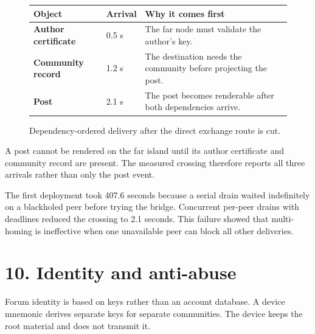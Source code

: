 \documentclass[12pt,a4paper]{article}
\begin{document}
\begin{figure}[H]\centering
\begin{tabular}{@{}>{\bfseries}p{}p{}p{}@{}}
\toprule Object & Arrival & Why it comes first \\
\midrule Author certificate & 0.5 s & The far node must validate the author's key. \\
Community record & 1.2 s & The destination needs the community before projecting the post. \\
Post & 2.1 s & The post becomes renderable after both dependencies arrive. \\
\bottomrule
\end{tabular}
\caption{Dependency-ordered delivery after the direct exchange route is cut.}
\end{figure}
A post cannot be rendered on the far island until its author certificate and community record are present. The measured crossing therefore reports all three arrivals rather than only the post event.

The first deployment took 407.6 seconds because a serial drain waited indefinitely on a blackholed peer before trying the bridge. Concurrent per-peer drains with deadlines reduced the crossing to 2.1 seconds. This failure showed that multi-homing is ineffective when one unavailable peer can block all other deliveries.

\section*{10. Identity and anti-abuse}
Forum identity is based on keys rather than an account database. A device mnemonic derives separate keys for separate communities. The device keeps the root material and does not transmit it.
\end{document}
